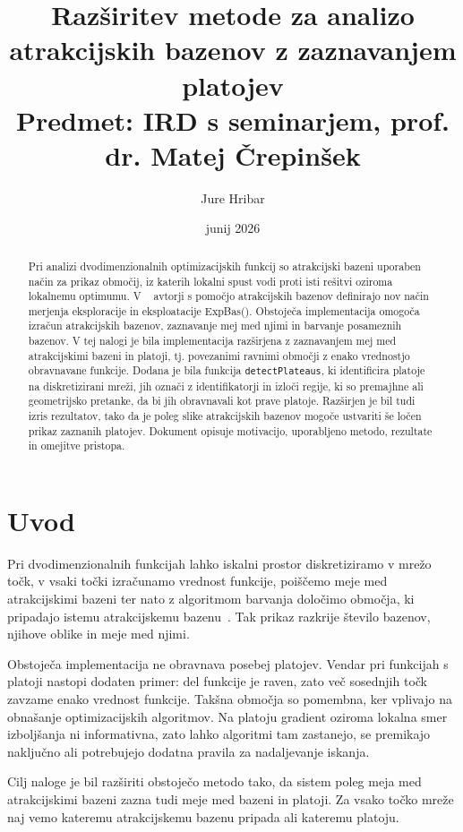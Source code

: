 \documentclass[12pt,a4paper]{article}
\title{Razširitev metode za analizo atrakcijskih bazenov z zaznavanjem platojev\\[0.5em]
    \large Predmet: IRD s seminarjem, prof. dr. Matej Črepinšek}
\author{Jure Hribar}
\date{junij 2026}
\begin{document}
    
    \maketitle
    
    \begin{abstract}
        Pri analizi dvodimenzionalnih optimizacijskih funkcij so atrakcijski bazeni uporaben način za prikaz območij, iz katerih lokalni spust vodi proti isti rešitvi oziroma lokalnemu optimumu. V ~\cite{jerebic_novel_2021} avtorji s pomočjo atrakcijskih bazenov definirajo nov način merjenja eksploracije in eksploatacije ExpBas(). Obstoječa implementacija omogoča izračun atrakcijskih bazenov, zaznavanje mej med njimi in barvanje posameznih bazenov. V tej nalogi je bila implementacija razširjena z zaznavanjem mej med atrakcijskimi bazeni in platoji, tj. povezanimi ravnimi območji z enako vrednostjo obravnavane funkcije. Dodana je bila funkcija \texttt{detectPlateaus}, ki identificira platoje na diskretizirani mreži, jih označi z identifikatorji in izloči regije, ki so premajhne ali geometrijsko pretanke, da bi jih obravnavali kot prave platoje. Razširjen je bil tudi izris rezultatov, tako da je poleg slike atrakcijskih bazenov mogoče ustvariti še ločen prikaz zaznanih platojev. Dokument opisuje motivacijo, uporabljeno metodo, rezultate in omejitve pristopa.
    \end{abstract}
    
    \section{Uvod}
    
    Pri dvodimenzionalnih funkcijah lahko iskalni prostor diskretiziramo v mrežo točk, v vsaki točki izračunamo vrednost funkcije, poiščemo meje med atrakcijskimi bazeni ter nato z algoritmom barvanja določimo območja, ki pripadajo istemu atrakcijskemu bazenu~\cite{jerebic_novel_2021}. Tak prikaz razkrije število bazenov, njihove oblike in meje med njimi.
    
    Obstoječa implementacija ne obravnava posebej platojev. Vendar pri funkcijah s platoji nastopi dodaten primer: del funkcije je raven, zato več sosednjih točk zavzame enako vrednost funkcije. Takšna območja so pomembna, ker vplivajo na obnašanje optimizacijskih algoritmov. Na platoju gradient oziroma lokalna smer izboljšanja ni informativna, zato lahko algoritmi tam zastanejo, se premikajo naključno ali potrebujejo dodatna pravila za nadaljevanje iskanja.
    
    Cilj naloge je bil razširiti obstoječo metodo tako, da sistem poleg meja med atrakcijskimi bazeni zazna tudi meje med bazeni in platoji. Za vsako točko mreže naj vemo kateremu atrakcijskemu bazenu pripada ali kateremu platoju.
    
\end{document}
